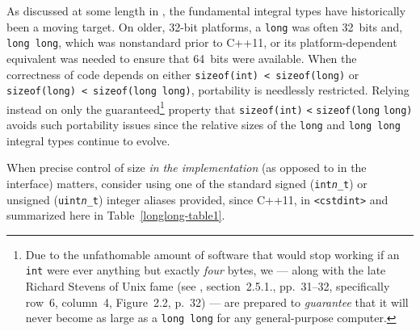 As discussed at some length in ,
the
fundamental integral types have historically been a moving target. On
older, 32-bit platforms, a \lstinline!long! was often 32~bits and, \lstinline!long!~\lstinline!long!, which was nonstandard prior to C++11, or its platform-dependent equivalent was needed to ensure that 64~bits were
available. When the correctness of code depends on either
\lstinline!sizeof(int)!~\lstinline!<!~\lstinline!sizeof(long)! or
\lstinline!sizeof(long)!~\lstinline!<!~\lstinline!sizeof(long!~\lstinline!long)!,
portability is needlessly restricted. Relying instead on only the
guaranteed{\cprotect\footnote{Due to the unfathomable amount of software
that would stop working if an \lstinline!int! were ever anything but
exactly \emph{four} bytes, we --- along with the late Richard Stevens
  of Unix fame (see \cite{stevens93}, section~2.5.1., pp.~31--32, specifically row~6, column~4, Figure~2.2, p.~32) --- are prepared
  to \emph{guarantee} that it will never become as large as a
  \lstinline!long!~\lstinline!long! for any general-purpose computer.}}
property that
\lstinline!sizeof(int)! \lstinline!<! \lstinline!sizeof(long! \lstinline!long)!
avoids such portability issues since the relative sizes of the \lstinline!long! and \lstinline!long!~\lstinline!long! integral
types continue to evolve.

When precise control of size \emph{in the implementation} (as opposed to
in the interface) matters, consider using one of the standard signed 
(\texttt{int{\itshape n}\_t}) or unsigned (\texttt{uint{\itshape n}\_t}) integer  
aliases provided, since C++11, in \lstinline!<cstdint>! and
summarized here in Table~\ref{longlong-table1}.%

